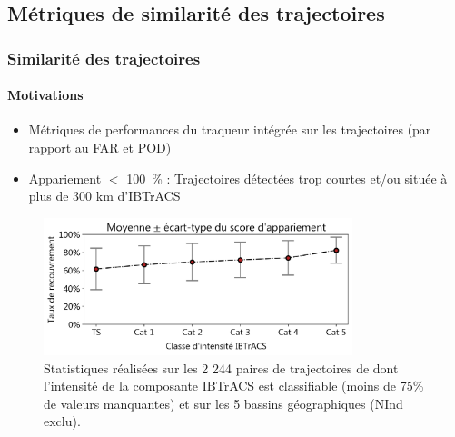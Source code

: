\documentclass[aspectratio=169, usepdftitle=false, xcolor={dvipsnames}, 9pt,table]{beamer}
\begin{document}
 \subsection[Similarité des trajectoires]{Métriques de similarité des trajectoires}
 \makesubsecslide
 \begin{frame}[c]
     \frametitle{Similarité des trajectoires}
     \framesubtitle{Motivations}
     \small
     \vspace{1em}
     \begin{definition}
         \begin{itemize}
             \item Métriques de performances du traqueur \alert{intégrée} sur les trajectoires (par rapport au FAR et POD)
             \item Appariement $<$ 100~\% : Trajectoires détectées trop courtes \alert{et/ou} située à plus de 300 km d'IBTrACS
         \end{itemize}
     \end{definition}
     \begin{figure}
         \centering
         \includegraphics[height=4cm]{Figures/coverage_ratio.png}
         \captionsetup{width=0.75\textwidth}
         \caption{Statistiques réalisées sur les 2 244 paires de trajectoires de \cite{dulac_assessing_2023} dont l'intensité de la composante IBTrACS est
         classifiable (moins de 75\% de valeurs manquantes) et sur les 5 bassins géographiques (NInd exclu).}
     \end{figure}
 \end{frame}
 
\end{document}
